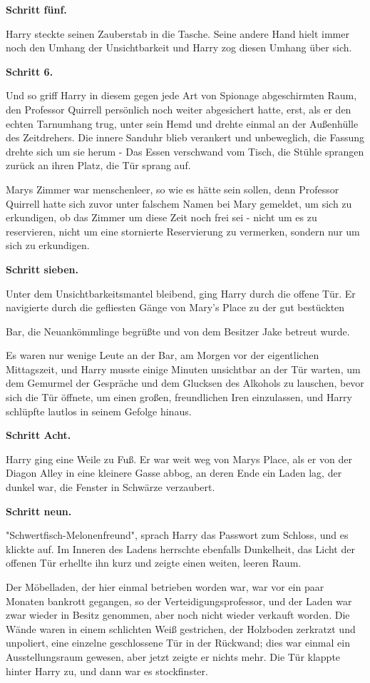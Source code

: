 {\textbf{Schritt fünf.}

Harry steckte seinen Zauberstab in die Tasche. Seine andere Hand hielt immer noch den Umhang der Unsichtbarkeit und Harry zog diesen Umhang über sich.

\textbf{Schritt 6.}

Und so griff Harry in diesem gegen jede Art von Spionage abgeschirmten Raum, den Professor Quirrell persönlich noch weiter abgesichert hatte, erst, als er den echten Tarnumhang trug, unter sein Hemd und drehte einmal an der Außenhülle des Zeitdrehers. Die innere Sanduhr blieb verankert und unbeweglich, die Fassung drehte sich um sie herum - Das Essen verschwand vom Tisch, die Stühle sprangen zurück an ihren Platz, die Tür sprang auf.

Marys Zimmer war menschenleer, so wie es hätte sein sollen, denn Professor Quirrell hatte sich zuvor unter falschem Namen bei Mary gemeldet, um sich zu erkundigen, ob das Zimmer um diese Zeit noch frei sei - nicht um es zu reservieren, nicht um eine stornierte Reservierung zu vermerken, sondern nur um sich zu erkundigen.

\textbf{Schritt sieben.}

Unter dem Unsichtbarkeitsmantel bleibend, ging Harry durch die offene Tür. Er navigierte durch die gefliesten Gänge von Mary's Place zu der gut bestückten

Bar, die Neuankömmlinge begrüßte und von dem Besitzer Jake betreut wurde.

Es waren nur wenige Leute an der Bar, am Morgen vor der eigentlichen Mittagszeit, und Harry musste einige Minuten unsichtbar an der Tür warten, um dem Gemurmel der Gespräche und dem Glucksen des Alkohols zu lauschen, bevor sich die Tür öffnete, um einen großen, freundlichen Iren einzulassen, und Harry schlüpfte lautlos in seinem Gefolge hinaus.

\textbf{Schritt Acht.}

Harry ging eine Weile zu Fuß. Er war weit weg von Marys Place, als er von der Diagon Alley in eine kleinere Gasse abbog, an deren Ende ein Laden lag, der dunkel war, die Fenster in Schwärze verzaubert.

\textbf{Schritt neun.}

"Schwertfisch-Melonenfreund", sprach Harry das Passwort zum Schloss, und es klickte auf. Im Inneren des Ladens herrschte ebenfalls Dunkelheit, das Licht der offenen Tür erhellte ihn kurz und zeigte einen weiten, leeren Raum.

Der Möbelladen, der hier einmal betrieben worden war, war vor ein paar Monaten bankrott gegangen, so der Verteidigungsprofessor, und der Laden war zwar wieder in Besitz genommen, aber noch nicht wieder verkauft worden. Die Wände waren in einem schlichten Weiß gestrichen, der Holzboden zerkratzt und unpoliert, eine einzelne geschlossene Tür in der Rückwand; dies war einmal ein Ausstellungsraum gewesen, aber jetzt zeigte er nichts mehr. Die Tür klappte hinter Harry zu, und dann war es stockfinster.

}
